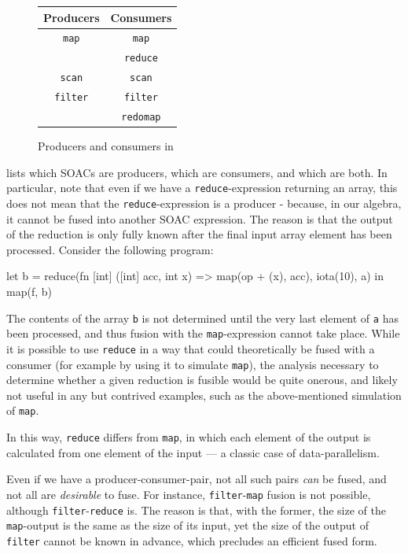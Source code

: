 \begin{figure}
  \begin{center}
    \begin{tabular}{c|c}
      \textbf{Producers} & \textbf{Consumers} \\\hline
      \texttt{map} & \texttt{map} \\\hline
      & \texttt{reduce} \\\hline
      \texttt{scan} & \texttt{scan} \\\hline
      \texttt{filter} & \texttt{filter} \\\hline
      & \texttt{redomap} \\\hline
    \end{tabular}
  \end{center}
  \caption{Producers and consumers in \LO}
  \label{fig:producers-consumers}
\end{figure}

 lists which \LO{} SOACs are producers,
which are consumers, and which are both.  In particular, note that
even if we have a \texttt{reduce}-expression returning an array, this
does not mean that the \texttt{reduce}-expression is a producer -
because, in our algebra, it cannot be fused into another SOAC
expression.  The reason is that the output of the reduction is only
fully known after the final input array element has been processed.
Consider the following program:

\begin{colorcode}
let b = reduce(fn [int] ([int] acc, int x) =>
                 map(op + (x), acc),
               iota(10), a) in
map(f, b)
\end{colorcode}

The contents of the array \texttt{b} is not determined until the very
last element of \texttt{a} has been processed, and thus fusion with
the \texttt{map}-expression cannot take place.  While it is possible
to use \texttt{reduce} in a way that could theoretically be fused with
a consumer (for example by using it to simulate \texttt{map}), the
analysis necessary to determine whether a given reduction is fusible
would be quite onerous, and likely not useful in any but contrived
examples, such as the above-mentioned simulation of \texttt{map}.

In this way, \texttt{reduce} differs from \texttt{map}, in which each
element of the output is calculated from one element of the input ---
a classic case of data-parallelism.

Even if we have a producer-consumer-pair, not all such pairs
\textit{can} be fused, and not all are \textit{desirable} to fuse.
For instance, \texttt{filter}-\texttt{map} fusion is not possible,
although \texttt{filter}-\texttt{reduce} is.  The reason is that, with
the former, the size of the \texttt{map}-output is the same as the
size of its input, yet the size of the output of \texttt{filter}
cannot be known in advance, which precludes an efficient fused form.

